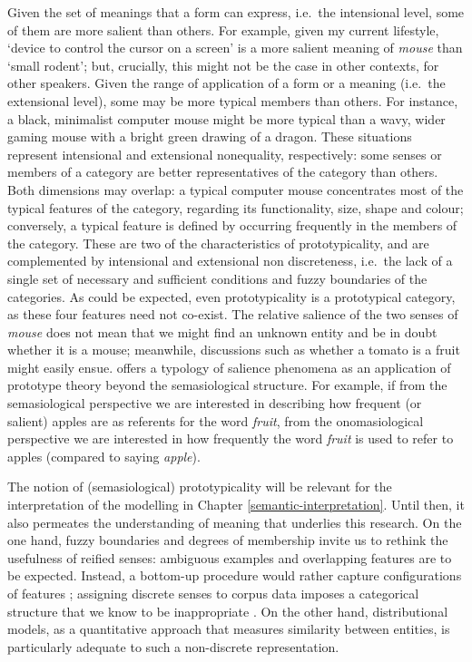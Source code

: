 \documentclass[
]{book}
\begin{document}
Given the set of meanings that a form can express, i.e.~the intensional level, some of them are more salient than others. For example, given my current lifestyle, `device to control the cursor on a screen' is a more salient meaning of \emph{mouse} than `small rodent'; but, crucially, this might not be the case in other contexts, for other speakers. Given the range of application of a form or a meaning (i.e.~the extensional level), some may be more typical members than others. For instance, a black, minimalist computer mouse might be more typical than a wavy, wider gaming mouse with a bright green drawing of a dragon. These situations represent intensional and extensional nonequality, respectively: some senses or members of a category are better representatives of the category than others. Both dimensions may overlap: a typical computer mouse concentrates most of the typical features of the category, regarding its functionality, size, shape and colour; conversely, a typical feature is defined by occurring frequently in the members of the category. These are two of the characteristics of prototypicality, and are complemented by intensional and extensional non discreteness, i.e.~the lack of a single set of necessary and sufficient conditions and fuzzy boundaries of the categories. As could be expected, even prototypicality is a prototypical category, as these four features need not co-exist. The relative salience of the two senses of \emph{mouse} does not mean that we might find an unknown entity and be in doubt whether it is a mouse; meanwhile, discussions such as whether a tomato is a fruit might easily ensue. \textcite[Ch. 4]{geeraerts_2006e} offers a typology of salience phenomena as an application of prototype theory beyond the semasiological structure. For example, if from the semasiological perspective we are interested in describing how frequent (or salient) apples are as referents for the word \emph{fruit}, from the onomasiological perspective we are interested in how frequently the word \emph{fruit} is used to refer to apples (compared to saying \emph{apple}).

The notion of (semasiological) prototypicality will be relevant for the interpretation of the modelling in Chapter \ref{semantic-interpretation}. Until then, it also permeates the understanding of meaning that underlies this research. On the one hand, fuzzy boundaries and degrees of membership invite us to rethink the usefulness of reified senses: ambiguous examples and overlapping features are to be expected. Instead, a bottom-up procedure would rather capture configurations of features \autocite{glynn_2014c}; assigning discrete senses to corpus data imposes a categorical structure that we know to be inappropriate \autocite[see also][]{geeraerts_1993}. On the other hand, distributional models, as a quantitative approach that measures similarity between entities, is particularly adequate to such a non-discrete representation.
\end{document}
